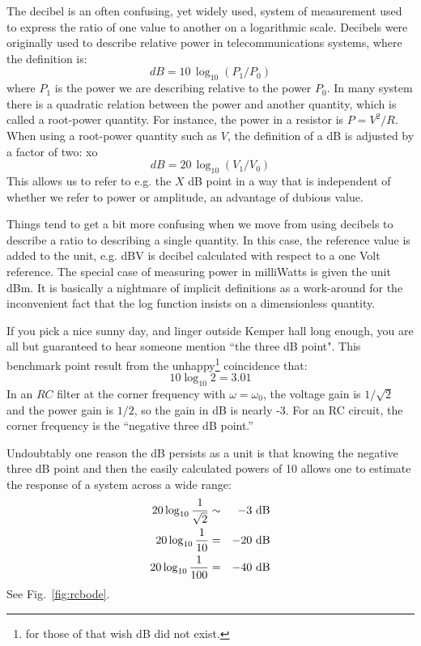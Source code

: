 \documentclass[12pt,oneside]{book}
\begin{document}
The decibel is an often confusing, yet widely used, system of measurement used to express the ratio of one value to another on a logarithmic scale.  Decibels were originally used to describe relative power in telecommunications systems, where the definition is:
\begin{equation}
dB = 10 \, \log_{10}(P_1 / P_0)
\end{equation}
where $P_1$ is the power we are describing relative to the power $P_0$.  In many system there is a quadratic relation between the power and another quantity, which is called a root-power quantity.
For instance, the power in a resistor is $P=V^2/R$.  When using a root-power quantity such as $V$, the definition of a dB is adjusted by a factor of two:
xo\begin{equation}
dB = 20 \, \log_{10}(V_1 / V_0)
\end{equation}
This allows us to refer to e.g. the $X$ dB point in a way that is independent of whether we refer to power or amplitude, an advantage of dubious value.

Things tend to get a bit more confusing when we move from using decibels to describe a ratio to describing a single quantity.  In this case, the reference value is added to the unit, e.g. dBV is decibel calculated with respect to a one Volt reference.   The special case of measuring power in milliWatts is given the unit dBm.  It is basically a nightmare of implicit definitions as a work-around for the inconvenient fact that the log function insists on a dimensionless quantity.

If you pick a nice sunny day, and linger outside Kemper hall long enough, you are all but guaranteed to hear someone mention ``the three dB point".   This benchmark point result from the unhappy\footnote{for those of that wish dB did not exist.} coincidence that:
\begin{equation*}
10 \log_{10} 2 = 3.01
\end{equation*}
In an $RC$ filter at the corner frequency with $\omega = \omega_0$, the voltage gain is $1/\sqrt{2}$ and the power gain is $1/2$, so the gain in dB is nearly -3.  For an RC circuit, the corner frequency is the ``negative three dB point.''

Undoubtably one reason the dB persists as a unit is that knowing the negative three dB point and then the easily calculated powers of 10 allows one to estimate the response of a system across a wide range:
\begin{eqnarray*}
20 \log_{10} \frac{1}{\sqrt{2}} &\sim& -3~\rm dB\\
20 \log_{10} \frac{1}{10} &=& -20~\rm dB\\
20 \log_{10} \frac{1}{100} &=& -40~\rm dB\\
\end{eqnarray*}
See Fig.~\ref{fig:rcbode}.
\end{document}
